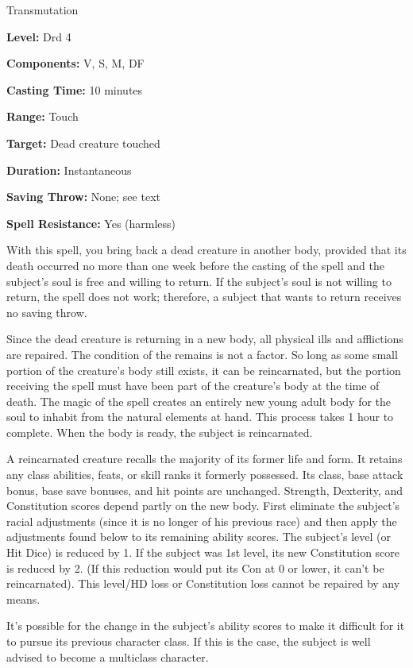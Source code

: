 
Transmutation

\textbf{Level:} Drd 4

\textbf{Components:} V, S, M, DF

\textbf{Casting Time:} 10 minutes

\textbf{Range:} Touch

\textbf{Target:} Dead creature touched

\textbf{Duration:} Instantaneous

\textbf{Saving Throw:} None; see text

\textbf{Spell Resistance:} Yes (harmless)

With this spell, you bring back a dead creature in another body, provided that 
its death occurred no more than one week before the casting of the spell and the 
subject's soul is free and willing to return. If the subject's soul is not willing 
to return, the spell does not work; therefore, a subject that wants to return receives 
no saving throw.

Since the dead creature is returning in a new body, all physical ills and afflictions 
are repaired. The condition of the remains is not a factor. So long as some small 
portion of the creature's body still exists, it can be reincarnated, but the portion 
receiving the spell must have been part of the creature's body at the time of death. 
The magic of the spell creates an entirely new young adult body for the soul to 
inhabit from the natural elements at hand. This process takes 1 hour to complete. 
 When the body is ready, the subject is reincarnated.

A reincarnated creature recalls the majority of its former life and form. It retains 
any class abilities, feats, or skill ranks it formerly possessed. Its class, base 
attack bonus, base save bonuses, and hit points are unchanged. Strength, Dexterity, 
and Constitution scores depend partly on the new body. First eliminate the subject's 
racial adjustments (since it is no longer of his previous race) and then apply 
the adjustments found below to its remaining ability scores. The subject's level 
(or Hit Dice) is reduced by 1. If the subject was 1st level, its new Constitution 
score is reduced by 2. (If this reduction would put its Con at 0 or lower, it can't 
be reincarnated). This level/HD loss or Constitution loss cannot be repaired by 
any means.

It's possible for the change in the subject's ability scores to make it difficult 
for it to pursue its previous character class. If this is the case, the subject 
is well advised to become a multiclass character.

